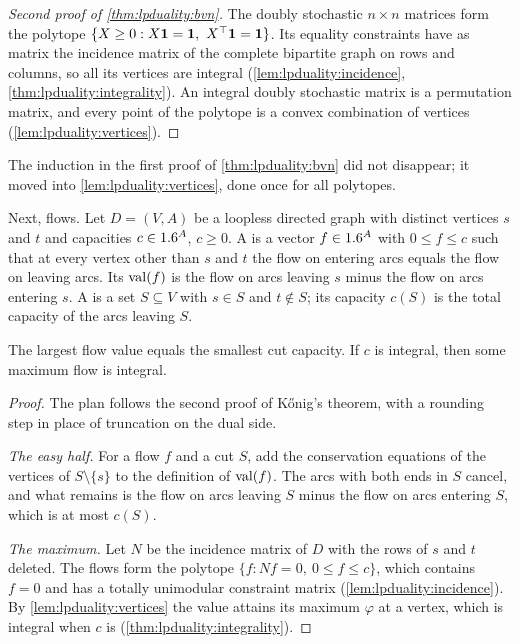 \begin{refsection}
\begin{proof}[Second proof of \cref{thm:lpduality:bvn}]
The doubly stochastic $n\times n$ matrices form the polytope $\{X\ge0: X\mathbf{1}=\mathbf{1},\ X^\top\mathbf{1}=\mathbf{1}\}$. Its equality constraints have as matrix the incidence matrix of the complete bipartite graph on rows and columns, so all its vertices are integral (\cref{lem:lpduality:incidence}, \cref{thm:lpduality:integrality}). An integral doubly stochastic matrix is a permutation matrix, and every point of the polytope is a convex combination of vertices (\cref{lem:lpduality:vertices}).
\end{proof}

The induction in the first proof of \cref{thm:lpduality:bvn} did not disappear; it moved into \cref{lem:lpduality:vertices}, done once for all polytopes.

Next, flows. Let $D=(V,A)$ be a loopless directed graph with distinct vertices $s$ and $t$ and capacities $c\in1.6^A$, $c\ge0$. A  is a vector $f\in1.6^A$ with $0\le f\le c$ such that at every vertex other than $s$ and $t$ the flow on entering arcs equals the flow on leaving arcs. Its  $\operatorname{val}(f)$ is the flow on arcs leaving $s$ minus the flow on arcs entering $s$. A  is a set $S\subseteq V$ with $s\in S$ and $t\notin S$; its capacity $c(S)$ is the total capacity of the arcs leaving $S$.

\begin{theorem}\label{thm:lpduality:maxflow}
The largest flow value equals the smallest cut capacity. If $c$ is integral, then some maximum flow is integral.
\end{theorem}

\begin{proof}
The plan follows the second proof of K\H{o}nig's theorem, with a rounding step in place of truncation on the dual side.

\emph{The easy half.} For a flow $f$ and a cut $S$, add the conservation equations of the vertices of $S\setminus\{s\}$ to the definition of $\operatorname{val}(f)$. The arcs with both ends in $S$ cancel, and what remains is the flow on arcs leaving $S$ minus the flow on arcs entering $S$, which is at most $c(S)$.

\emph{The maximum.} Let $N$ be the incidence matrix of $D$ with the rows of $s$ and $t$ deleted. The flows form the polytope $\{f:Nf=0,\ 0\le f\le c\}$, which contains $f=0$ and has a totally unimodular constraint matrix (\cref{lem:lpduality:incidence}). By \cref{lem:lpduality:vertices} the value attains its maximum $\varphi$ at a vertex, which is integral when $c$ is (\cref{thm:lpduality:integrality}).


\end{proof}
\end{refsection}

